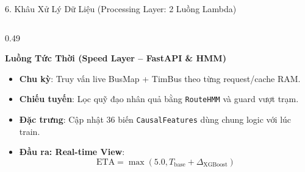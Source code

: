 \documentclass[aspectratio=169,10pt]{beamer}
\begin{document}
\begin{frame}{6. Khâu Xử Lý Dữ Liệu (Processing Layer: 2 Luồng Lambda)}
\begin{columns}[T]
    \begin{column}{0.49\textwidth}
        \begin{exampleblock}{\textbf{Luồng Tức Thời (Speed Layer -- FastAPI \& HMM)}}
            \begin{itemize}\setlength{\itemsep}{2pt}\footnotesize
                \item \textbf{Chu kỳ}: Truy vấn live BusMap + TimBus theo từng request/cache RAM.
                \item \textbf{Chiếu tuyến}: Lọc quỹ đạo nhân quả bằng \texttt{RouteHMM} và guard vượt trạm.
                \item \textbf{Đặc trưng}: Cập nhật 36 biến \texttt{CausalFeatures} dùng chung logic với lúc train.
                \item \textbf{Đầu ra: Real-time View}:
                $$\text{ETA} = \max(5.0, T_{\text{base}} + \Delta_{\text{XGBoost}})$$
            \end{itemize}
        \end{exampleblock}
        \vspace{2pt}
        \centering
    \end{column}
\end{columns}
\end{frame}
\end{document}

